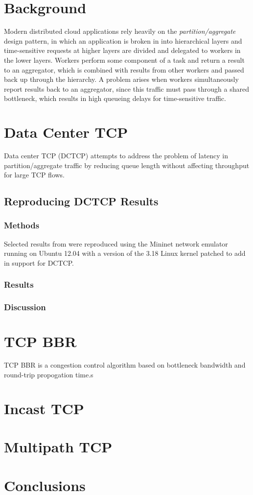 \section{Background}

Modern distributed cloud applications rely heavily on the \emph{partition/aggregate} design pattern, in which an application is broken in into hierarchical layers and time-sensitive requests at higher layers are divided and delegated to workers in the lower layers. Workers perform some component of a task and return a result to an aggregator, which is combined with results from other workers and passed back up through the hierarchy. A problem arises when workers simultaneously report results back to an aggregator, since this traffic must pass through a shared bottleneck, which results in high queueing delays for time-sensitive traffic. 


\section{Data Center TCP}

Data center TCP (DCTCP) attempts to address the problem of latency in partition/aggregate traffic by reducing queue length without affecting throughput for large TCP flows.

\subsection{Reproducing DCTCP Results}

\subsubsection{Methods}

Selected results from \cite{alizadeh_data_2010} were reproduced using the Mininet network emulator running on Ubuntu 12.04 with a version of the 3.18 Linux kernel patched to add in support for DCTCP. 

\subsubsection{Results}

\subsubsection{Discussion}

\section{TCP BBR}

TCP BBR is a congestion control algorithm based on bottleneck bandwidth and round-trip propogation time.s

\section{Incast TCP}

\section{Multipath TCP}

\section{Conclusions}

